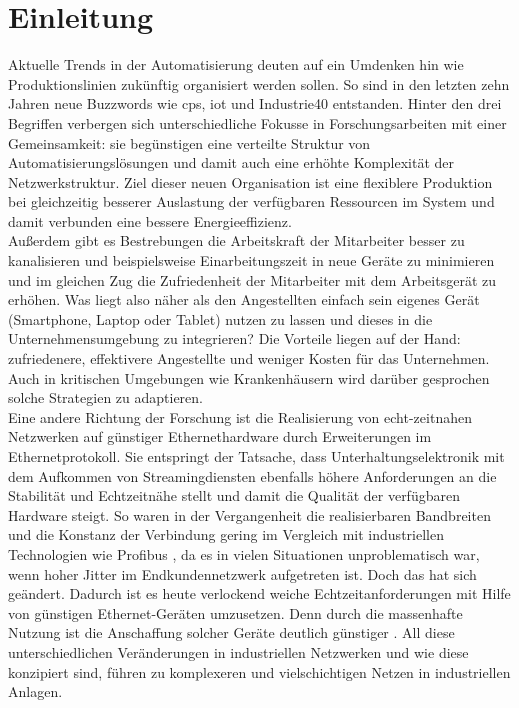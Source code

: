 \chapter{Einleitung}
Aktuelle Trends in der Automatisierung deuten auf ein Umdenken hin wie Produktionslinien zukünftig organisiert werden sollen. So sind in den letzten zehn Jahren neue Buzzwords wie \acrfull{cps}, \acrfull{iot} und \Gls{Industrie40} entstanden. Hinter den drei Begriffen verbergen sich unterschiedliche Fokusse in Forschungsarbeiten mit einer Gemeinsamkeit: sie begünstigen eine verteilte Struktur von Automatisierungslösungen und damit auch eine erhöhte Komplexität der Netzwerkstruktur. Ziel dieser neuen Organisation ist eine flexiblere Produktion bei gleichzeitig besserer Auslastung der verfügbaren Ressourcen im System und damit verbunden eine bessere Energieeffizienz.\cite{wollschlaeger2017future} \\
Außerdem gibt es Bestrebungen die Arbeitskraft der Mitarbeiter besser zu kanalisieren und beispielsweise Einarbeitungszeit in neue Geräte zu minimieren und im gleichen Zug die Zufriedenheit der Mitarbeiter mit dem Arbeitsgerät zu erhöhen. Was liegt also näher als den Angestellten einfach sein eigenes Gerät (Smartphone, Laptop oder Tablet) nutzen zu lassen und dieses in die Unternehmensumgebung zu integrieren? Die Vorteile liegen auf der Hand: zufriedenere, effektivere Angestellte und weniger Kosten für das Unternehmen. Auch in kritischen Umgebungen wie Krankenhäusern wird darüber gesprochen solche Strategien zu adaptieren. \cite{wani2020hospital, french2014current} \\
Eine andere Richtung der Forschung ist die Realisierung von echt-zeitnahen Netzwerken auf günstiger Ethernethardware durch Erweiterungen im Ethernetprotokoll. Sie entspringt der Tatsache, dass Unterhaltungselektronik mit dem Aufkommen von Streamingdiensten ebenfalls höhere Anforderungen an die Stabilität und Echtzeitnähe stellt\cite{wollschlaeger2017future} und damit die Qualität der verfügbaren Hardware steigt. So waren in der Vergangenheit die realisierbaren Bandbreiten und die Konstanz der Verbindung gering im Vergleich mit industriellen Technologien wie Profibus \cite{tovar1999real}, da es in vielen Situationen unproblematisch war, wenn hoher \Gls{Jitter} im Endkundennetzwerk aufgetreten ist. Doch das hat sich geändert. Dadurch ist es heute verlockend weiche Echtzeitanforderungen mit Hilfe von günstigen Ethernet-Geräten umzusetzen. Denn durch die massenhafte Nutzung ist die Anschaffung solcher Geräte deutlich günstiger \cite{enduserSwitch, profinetSwitch}. All diese unterschiedlichen Veränderungen in industriellen Netzwerken und wie diese konzipiert sind, führen zu komplexeren und vielschichtigen Netzen in industriellen Anlagen. \\
